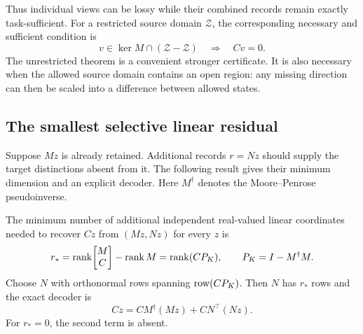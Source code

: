 Thus individual views can be lossy while their combined records remain exactly
task-sufficient. For a restricted source domain $\mathcal Z$, the corresponding
necessary and sufficient condition is
\begin{equation}
  v\in\ker M\cap(\mathcal Z-\mathcal Z)
  \quad\Longrightarrow\quad Cv=0.
  \label{atl:restricted-domain}
\end{equation}
The unrestricted theorem is a convenient stronger certificate. It is also
necessary when the allowed source domain contains an open region: any missing
direction can then be scaled into a difference between allowed states.

\subsection{The smallest selective linear residual}
\label{atl:minimal-residual}

Suppose $Mz$ is already retained. Additional records $r=Nz$ should supply the
target distinctions absent from it. The following result gives their minimum
dimension and an explicit decoder. Here $M^\dagger$ denotes the Moore--Penrose
pseudoinverse.

\begin{theorem}
\label{atl:residual-theorem}
The minimum number of additional independent real-valued linear coordinates
needed to recover $Cz$ from $(Mz,Nz)$ for every $z$ is
\begin{equation}
  r_*=
  \operatorname{rank}\!\begin{bmatrix}M\\C\end{bmatrix}-\operatorname{rank} M
  =\operatorname{rank}(CP_K),
  \qquad P_K=I-M^\dagger M.
  \label{atl:minimum-rank}
\end{equation}
Choose $N$ with orthonormal rows spanning $\operatorname{row}(CP_K)$. Then $N$ has $r_*$
rows and the exact decoder is
\begin{equation}
  Cz=C M^\dagger(Mz)+C N^\top(Nz).
  \label{atl:residual-decoder}
\end{equation}
For $r_*=0$, the second term is absent.
\end{theorem}

